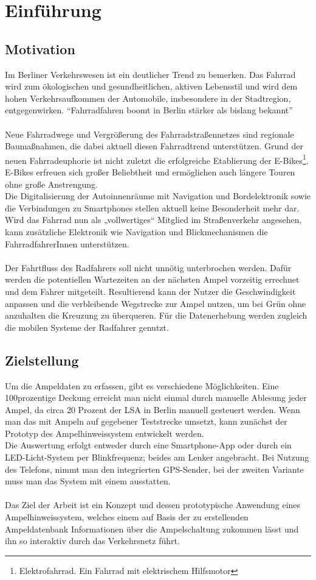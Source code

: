 \chapter{Einführung}
\section{Motivation}
Im Berliner Verkehrswesen ist ein deutlicher Trend zu bemerken. Das Fahrrad wird zum ökologischen und gesundheitlichen, aktiven Lebensstil und wird dem hohen Verkehrsaufkommen der Automobile, insbesondere in der Stadtregion, entgegenwirken. “Fahrradfahren boomt in Berlin stärker als bislang bekannt”\cite{Mopo}\\\\
Neue Fahrradwege und Vergrößerung des Fahrradstraßennetzes sind regionale Baumaßnahmen, die dabei aktuell diesen Fahrradtrend unterstützen. Grund der neuen Fahrradeuphorie ist nicht zuletzt die erfolgreiche Etablierung der E-Bikes\footnote{ Elektrofahrrad. Ein Fahrrad mit elektrischem Hilfsmotor}. 
E-Bikes erfreuen sich großer Beliebtheit und ermöglichen auch längere Touren ohne große Anstrengung.\\ 
Die Digitalisierung der Autoinnenräume mit Navigation und Bordelektronik sowie die Verbindungen zu Smartphones stellen aktuell keine Besonderheit mehr dar. Wird das Fahrrad nun als „vollwertiges“ Mitglied im Straßenverkehr angesehen, kann zusätzliche Elektronik wie Navigation und Blickmechanismen die FahrradfahrerInnen unterstützen.\\\\ 
Der Fahrtfluss des Radfahrers soll nicht unnötig unterbrochen werden. Dafür werden die potentiellen Wartezeiten an der nächsten Ampel vorzeitig errechnet und dem Fahrer mitgeteilt. Resultierend kann der Nutzer die Geschwindigkeit anpassen und die verbleibende Wegstrecke zur Ampel nutzen, um bei Grün ohne anzuhalten die Kreuzung zu überqueren. Für die Datenerhebung werden zugleich die mobilen Systeme der Radfahrer genutzt.
\section{Zielstellung}
Um die Ampeldaten zu erfassen, gibt es verschiedene Möglichkeiten. Eine 100prozentige Deckung erreicht man nicht einmal durch manuelle Ablesung jeder Ampel, da circa 20 Prozent der \gls{LSA} in Berlin manuell gesteuert werden. Wenn man das mit Ampeln auf gegebener Teststrecke umsetzt, kann zunächst der Prototyp des Ampelhinweissystem entwickelt werden. \\
Die Auswertung erfolgt entweder durch eine Smartphone-App oder durch ein \gls{LED}-Licht-System per Blinkfrequenz; beides am Lenker angebracht. Bei Nutzung des Telefons, nimmt man den integrierten \gls{GPS}-Sender, bei der zweiten Variante muss man das System mit einem ausstatten.
\\\\
Das Ziel der Arbeit ist ein Konzept und dessen prototypische Anwendung eines Ampelhinweissystem, welches einem auf Basis der zu erstellenden  Ampeldatenbank Informationen über die Ampelschaltung zukommen lässt und ihn so interaktiv durch das Verkehrsnetz führt.
